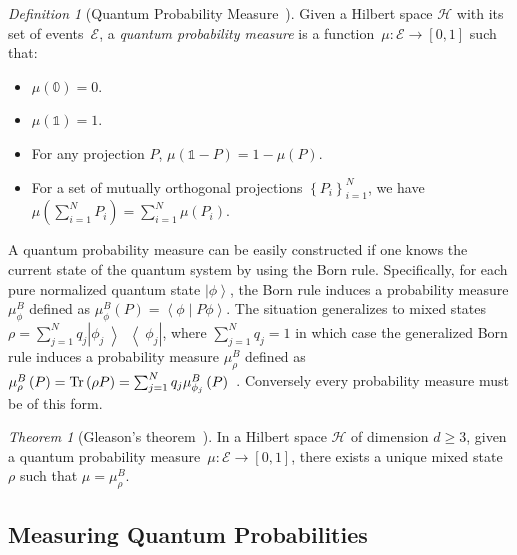 \documentclass[12pt]{iopart}
\theoremstyle{remark}
\newtheorem{definition}{Definition}
\newtheorem{thm}{Theorem}
\newcommand{\Hilb}{\mathcal{H}}
\newcommand{\events}{\ensuremath{\mathcal{E}}}
\newcommand{\ket}[1]{{\left\vert{#1}\right\rangle}}
\newcommand{\op}[2]{\ensuremath{\left\vert{#1}\middle\rangle\middle\langle{#2}\right\vert}}
\newcommand{\proj}[1]{\op{#1}{#1}}
\newcommand{\ip}[2]{\ensuremath{\left\langle{#1}\middle\vert{#2}\right\rangle}}
\begin{document}
\begin{definition}[Quantum Probability Measure~\cite{10.2307/2308516,gleason1957,Redhead1987-REDINA,Maassen2010}]\label{def:QuantumProbabilitySpace}
Given a Hilbert space $\Hilb$ with its set of events~$\events$,
a \emph{quantum probability measure} is a function~$\mu:\events\rightarrow[0,1]$
such that: 
\begin{itemize}
\item $\mu(\mathbb{0})=0$. 
\item $\mu(\mathbb{1})=1$. 
\item For any projection $P$, $\mu\left(\mathbb{1}-P\right)=1-\mu\left(P\right)$.
\item For a set of mutually orthogonal projections $\left\{ P_{i}\right\} _{i=1}^{N}$,
we have $\mu\left(\sum_{i=1}^{N}P_{i}\right)=\sum_{i=1}^{N}\mu\left(P_{i}\right)$.
\end{itemize}
\end{definition}

\noindent A quantum probability measure can be easily constructed if
one knows the current state of the quantum system by using the Born
rule.  Specifically, for each
pure normalized quantum state $\ket{\phi}$, the Born rule induces a
probability measure $\mu_{\phi}^{B}$ defined as
$\mu_{\phi}^{B}(P)=\ip{\phi}{P\phi}$. The situation generalizes to
mixed states $\rho = \sum_{j=1}^{N}q_{j}\proj{\phi_{j}}$, where
$\sum_{j=1}^{N}q_{j}=1$ in which case the generalized Born rule
induces a probability measure $\mu_{\rho}^{B}$ defined
as
$\mu_{\rho}^{B}\left(P\right) = \mathop{\mathrm{Tr}}\nolimits\left(\rho P\right) =
\sum_{j=1}^{N}
q_{j}\mu_{\phi_{j}}^{B}\left(P\right)$~\cite{peres1995quantum,544199,Jaeger2007}.
Conversely every probability measure must be of this form.

\begin{thm}[Gleason's
  theorem~\cite{gleason1957,Redhead1987-REDINA,peres1995quantum}]\label{cor:Gleason's}In
a Hilbert space $\Hilb$ of dimension $d\geq3$, given a quantum probability
measure~$\mu:\events\rightarrow[0,1]$, there exists a unique mixed
state~$\rho$ such that $\mu=\mu_{\rho}^{B}$.
\end{thm}

\subsection{Measuring Quantum Probabilities}
\end{document}
